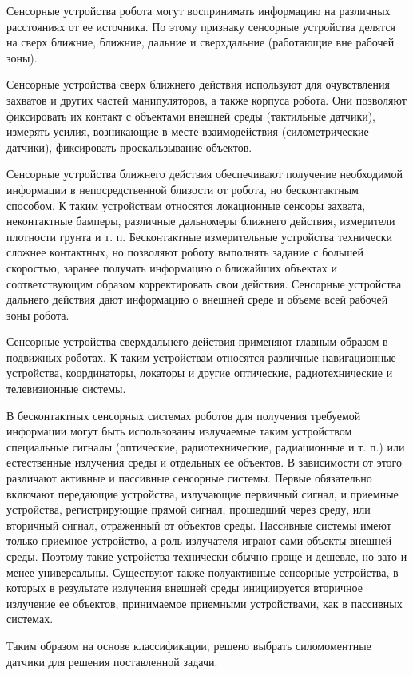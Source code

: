 Сенсорные устройства робота могут воспринимать информацию на различных расстояниях от ее источника. По этому признаку сенсорные устройства делятся на сверх ближние, ближние, дальние и сверхдальние (работающие вне рабочей зоны).

Сенсорные устройства сверх ближнего действия используют для очувствления захватов и других частей манипуляторов, а также корпуса робота. Они позволяют фиксировать их контакт с объектами внешней среды (тактильные датчики), измерять усилия, возникающие в месте взаимодействия (силометрические датчики), фиксировать проскальзывание объектов.

Сенсорные устройства ближнего действия обеспечивают получение необходимой информации в непосредственной близости от робота, но бесконтактным способом. К таким устройствам относятся локационные сенсоры захвата, неконтактные бамперы, различные дальномеры ближнего действия, измерители плотности грунта и т. п. Бесконтактные измерительные устройства технически сложнее контактных, но позволяют роботу выполнять задание с большей скоростью, заранее получать информацию о ближайших объектах и соответствующим образом корректировать свои действия.
Сенсорные устройства дальнего действия дают информацию о внешней среде и объеме всей рабочей зоны робота.

Сенсорные устройства сверхдальнего действия применяют главным образом в подвижных роботах. К таким устройствам относятся различные навигационные устройства, координаторы, локаторы и другие оптические, радиотехнические и телевизионные системы.

В бесконтактных сенсорных системах роботов для получения требуемой информации могут быть использованы излучаемые таким устройством специальные сигналы (оптические, радиотехнические, радиационные и т. п.) или естественные излучения среды и отдельных ее объектов. В зависимости от этого различают активные и пассивные сенсорные системы. Первые обязательно включают передающие устройства, излучающие первичный сигнал, и приемные устройства, регистрирующие прямой сигнал, прошедший через среду, или вторичный сигнал, отраженный от объектов среды. Пассивные системы имеют только приемное устройство, а роль излучателя играют сами объекты внешней среды. Поэтому такие устройства технически обычно проще и дешевле, но зато и менее универсальны. Существуют также полуактивные сенсорные устройства, в которых в результате излучения внешней среды инициируется вторичное излучение ее объектов, принимаемое приемными устройствами, как в пассивных системах.
 
Таким образом на основе классификации, решено выбрать силомоментные датчики для решения поставленной задачи.